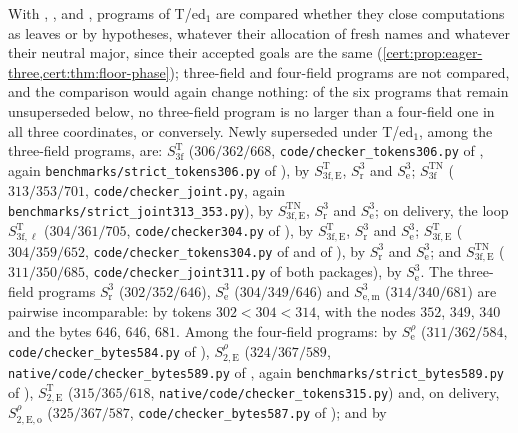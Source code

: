 With , ,  and
, programs of T/ed$_1$ are compared whether they
close computations as leaves or by hypotheses, whatever their allocation of fresh
names and whatever their neutral major, since their accepted goals are the same
(\cref{cert:prop:eager-three,cert:thm:floor-phase}); three-field and four-field programs
are not compared, and the comparison would again change nothing: of the six programs
that remain unsuperseded below, no three-field program is no larger than a four-field
one in all three coordinates, or conversely. Newly superseded under T/ed$_1$, among the
three-field programs, are: $S^{\mathrm T}_{3\mathrm f}$ ($306/362/668$,
\texttt{code/checker\_tokens306.py} of , again
\texttt{benchmarks/strict\_tokens306.py} of ), by
$S^{\mathrm T}_{3\mathrm f,\mathrm E}$, $S^{3}_{\mathrm r}$ and $S^{3}_{\mathrm e}$;
$S^{\mathrm{TN}}_{3\mathrm f}$ ($313/353/701$, \texttt{code/checker\_joint.py}, again
\texttt{benchmarks/strict\_joint313\_353.py}), by $S^{\mathrm{TN}}_{3\mathrm f,\mathrm E}$,
$S^{3}_{\mathrm r}$ and $S^{3}_{\mathrm e}$; on delivery, the loop
$S^{\mathrm T}_{3\mathrm f,\ell}$ ($304/361/705$, \texttt{code/checker304.py} of
), by $S^{\mathrm T}_{3\mathrm f,\mathrm E}$,
$S^{3}_{\mathrm r}$ and $S^{3}_{\mathrm e}$; $S^{\mathrm T}_{3\mathrm f,\mathrm E}$
($304/359/652$, \texttt{code/checker\_tokens304.py} of  and of
), by $S^{3}_{\mathrm r}$ and $S^{3}_{\mathrm e}$; and
$S^{\mathrm{TN}}_{3\mathrm f,\mathrm E}$ ($311/350/685$, \texttt{code/checker\_joint311.py}
of both packages), by $S^{3}_{\mathrm e}$. The three-field programs
$S^{3}_{\mathrm r}$ ($302/352/646$), $S^{3}_{\mathrm e}$ ($304/349/646$) and
$S^{3}_{\mathrm{e,m}}$ ($314/340/681$) are pairwise incomparable: by tokens
$302<304<314$, with the nodes $352$, $349$, $340$ and the bytes $646$, $646$, $681$.
Among the four-field programs: by $S^{\rho}_{\mathrm e}$ ($311/362/584$,
\texttt{code/checker\_bytes584.py} of ), $S^{\rho}_{2,\mathrm E}$
($324/367/589$, \texttt{native/code/checker\_bytes589.py} of ,
again \texttt{benchmarks/strict\_bytes589.py} of ),
$S^{\mathrm T}_{2,\mathrm E}$ ($315/365/618$, \texttt{native/code/checker\_tokens315.py})
and, on delivery, $S^{\rho}_{2,\mathrm{E,o}}$ ($325/367/587$,
\texttt{code/checker\_bytes587.py} of ); and by

